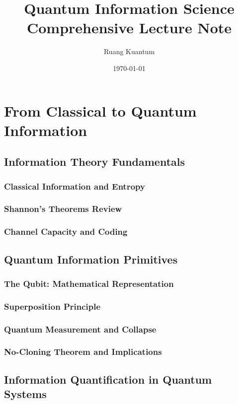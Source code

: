 \documentclass[12pt,a4paper]{book}
\title{{\Huge Quantum Information Science}\\
{\Large Comprehensive Lecture Note}}
\author{Ruang Kuantum}
\date{\today}
\begin{document}
\maketitle

\tableofcontents

\chapter{From Classical to Quantum Information}

\section{Information Theory Fundamentals}
\subsection{Classical Information and Entropy}
\subsection{Shannon's Theorems Review}
\subsection{Channel Capacity and Coding}

\section{Quantum Information Primitives}
\subsection{The Qubit: Mathematical Representation}
\subsection{Superposition Principle}
\subsection{Quantum Measurement and Collapse}
\subsection{No-Cloning Theorem and Implications}

\section{Information Quantification in Quantum Systems}
\end{document}
